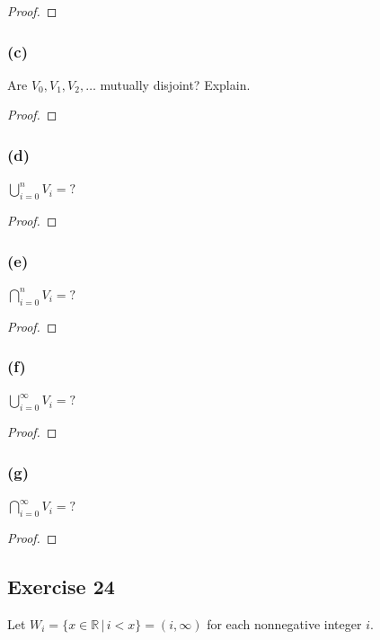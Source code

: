 \documentclass[14pt]{extarticle}
\newcommand{\dps}{\displaystyle}
\newcommand{\R}{\mathbb{R}}
\begin{document}
\begin{proof}

\end{proof}

\subsubsection{(c)}
Are \(V_0, V_1, V_2, \ldots\) mutually disjoint? Explain.

\begin{proof}

\end{proof}

\subsubsection{(d)}
\(\dps \bigcup_{i=0}^{n}V_i = ?\)

\begin{proof}

\end{proof}

\subsubsection{(e)}
\(\dps \bigcap_{i=0}^{n}V_i = ?\)

\begin{proof}

\end{proof}

\subsubsection{(f)}
\(\dps \bigcup_{i=0}^{\infty}V_i = ?\)
\begin{proof}

\end{proof}

\subsubsection{(g)}
\(\dps \bigcap_{i=0}^{\infty}V_i = ?\)

\begin{proof}

\end{proof}

\subsection{Exercise 24}
Let \(W_i = \{x \in \R \,|\, i < x\} = (i, \infty)\) for each nonnegative integer $i$.
\end{document}
